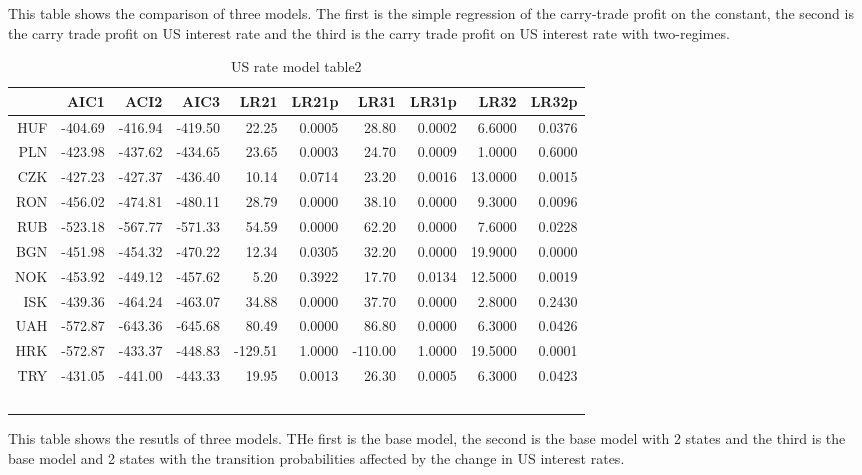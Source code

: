 \documentclass[12pt, a4paper, oneside]{article} %
\begin{document}
This table shows the comparison of three models.  The first is the simple regression of the carry-trade profit on the constant, the second is the carry trade profit on US interest rate and the third is the carry trade profit on US interest rate with two-regimes.  
\begin{landscape}
\begin{table}[ht]
\centering
\begin{tabular}{rrrrrrrrrr}
  \hline
 & AIC1 & ACI2 & AIC3 & LR21 & LR21p & LR31 & LR31p & LR32 & LR32p \\ 
  \hline
HUF & -404.69 & -416.94 & -419.50 & 22.25 & 0.0005 & 28.80 & 0.0002 & 6.6000 & 0.0376 \\ 
  PLN & -423.98 & -437.62 & -434.65 & 23.65 & 0.0003 & 24.70 & 0.0009 & 1.0000 & 0.6000 \\ 
  CZK & -427.23 & -427.37 & -436.40 & 10.14 & 0.0714 & 23.20 & 0.0016 & 13.0000 & 0.0015 \\ 
  RON & -456.02 & -474.81 & -480.11 & 28.79 & 0.0000 & 38.10 & 0.0000 & 9.3000 & 0.0096 \\ 
  RUB & -523.18 & -567.77 & -571.33 & 54.59 & 0.0000 & 62.20 & 0.0000 & 7.6000 & 0.0228 \\ 
  BGN & -451.98 & -454.32 & -470.22 & 12.34 & 0.0305 & 32.20 & 0.0000 & 19.9000 & 0.0000 \\ 
  NOK & -453.92 & -449.12 & -457.62 & 5.20 & 0.3922 & 17.70 & 0.0134 & 12.5000 & 0.0019 \\ 
  ISK & -439.36 & -464.24 & -463.07 & 34.88 & 0.0000 & 37.70 & 0.0000 & 2.8000 & 0.2430 \\ 
  UAH & -572.87 & -643.36 & -645.68 & 80.49 & 0.0000 & 86.80 & 0.0000 & 6.3000 & 0.0426 \\ 
  HRK & -572.87 & -433.37 & -448.83 & -129.51 & 1.0000 & -110.00 & 1.0000 & 19.5000 & 0.0001 \\ 
  TRY & -431.05 & -441.00 & -443.33 & 19.95 & 0.0013 & 26.30 & 0.0005 & 6.3000 & 0.0423 \\ 
   \hline\
\end{tabular}
\caption{US rate model table2} 
\label{tabref:comptab}
\end{table}
\end{landscape}


This table shows the resutls of three models.  THe first is the base model, the second is the base model with 2 states and the third is the base model and 2 states with the transition probabilities affected by the change in US interest rates. 

\end{document}
